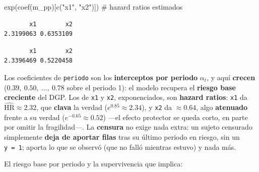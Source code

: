 \documentclass[
  letterpaper,
  DIV=11,
  numbers=noendperiod]{scrartcl}
\newenvironment{Shaded}{\begin{snugshade}}{\end{snugshade}}
\newcommand{\CommentTok}[1]{\textcolor[rgb]{0.37,0.37,0.37}{#1}}
\newcommand{\FunctionTok}[1]{\textcolor[rgb]{0.28,0.35,0.67}{#1}}
\newcommand{\NormalTok}[1]{\textcolor[rgb]{0.00,0.23,0.31}{#1}}
\newcommand{\SpecialCharTok}[1]{\textcolor[rgb]{0.37,0.37,0.37}{#1}}
\newcommand{\StringTok}[1]{\textcolor[rgb]{0.13,0.47,0.30}{#1}}
\begin{document}
\begin{Shaded}
\begin{Highlighting}[]
\FunctionTok{exp}\NormalTok{(}\FunctionTok{coef}\NormalTok{(m\_pp)[}\FunctionTok{c}\NormalTok{(}\StringTok{"x1"}\NormalTok{, }\StringTok{"x2"}\NormalTok{)])               }\CommentTok{\# hazard ratios estimados}
\end{Highlighting}
\end{Shaded}

\begin{verbatim}
       x1        x2 
2.3199063 0.6353109 
\end{verbatim}

\begin{Shaded}
\end{Shaded}

\begin{verbatim}
       x1        x2 
2.3396469 0.5220458 
\end{verbatim}

Los coeficientes de \texttt{periodo} son los \textbf{interceptos por
periodo} \(\alpha_t\), y aquí \textbf{crecen}
(\(0.39,\ 0.50,\ \dots,\ 0.78\) sobre el periodo 1): el modelo recupera
el \textbf{riesgo base creciente} del DGP. Los de \texttt{x1} y
\texttt{x2}, exponenciados, son \textbf{hazard ratios}: \texttt{x1} da
\(\widehat{\text{HR}}\approx2.32\), que \textbf{clava} la verdad
(\(e^{0.85}\approx2.34\)), y \texttt{x2} da \(\approx0.64\), algo
\textbf{atenuado} frente a su verdad (\(e^{-0.65}\approx0.52\)) ---el
efecto protector se queda corto, en parte por omitir la fragilidad---.
La \textbf{censura} no exige nada extra: un sujeto censurado simplemente
\textbf{deja de aportar filas} tras su último periodo en riesgo, sin un
\texttt{y\ =\ 1}; aporta lo que se observó (que no falló mientras
estuvo) y nada más.

El riesgo base por periodo y la supervivencia que implica:
\end{document}
